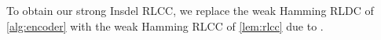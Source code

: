 To obtain our strong Insdel RLCC, we replace the weak Hamming RLDC of \cref{alg:encoder} with the weak Hamming RLCC of \cref{lem:rlcc} due to \cite{AsadiS21}. 

